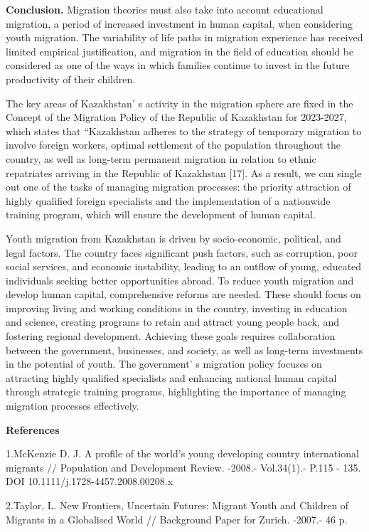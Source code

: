{\bfseries Conclusion.} Migration theories must also take into account
educational migration, a period of increased investment in human
capital, when considering youth migration. The variability of life paths
in migration experience has received limited empirical justification,
and migration in the field of education should be considered as one of
the ways in which families continue to invest in the future productivity
of their children.

The key areas of Kazakhstan' s activity in the migration
sphere are fixed in the Concept of the Migration Policy of the Republic
of Kazakhstan for 2023-2027, which states that ``Kazakhstan adheres to
the strategy of temporary migration to involve foreign workers, optimal
settlement of the population throughout the country, as well as
long-term permanent migration in relation to ethnic repatriates arriving
in the Republic of Kazakhstan {[}17{]}. As a result, we can single out
one of the tasks of managing migration processes: the priority
attraction of highly qualified foreign specialists and the
implementation of a nationwide training program, which will ensure the
development of human capital.

Youth migration from Kazakhstan is driven by socio-economic, political,
and legal factors. The country faces significant push factors, such as
corruption, poor social services, and economic instability, leading to
an outflow of young, educated individuals seeking better opportunities
abroad. To reduce youth migration and develop human capital,
comprehensive reforms are needed. These should focus on improving living
and working conditions in the country, investing in education and
science, creating programs to retain and attract young people back, and
fostering regional development. Achieving these goals requires
collaboration between the government, businesses, and society, as well
as long-term investments in the potential of youth. The
government' s migration policy focuses on attracting
highly qualified specialists and enhancing national human capital
through strategic training programs, highlighting the importance of
managing migration processes effectively.

{\bfseries References}

1.McKenzie D. J. A profile of the world's young developing country
international migrants // Population and Development Review. -2008.-
Vol.34(1).- P.115 - 135. DOI 10.1111/j.1728-4457.2008.00208.x

2.Taylor, L. New Frontiers, Uncertain Futures: Migrant Youth and
Children of Migrants in a Globalised World // Background Paper for
Zurich. -2007.- 46 p.


